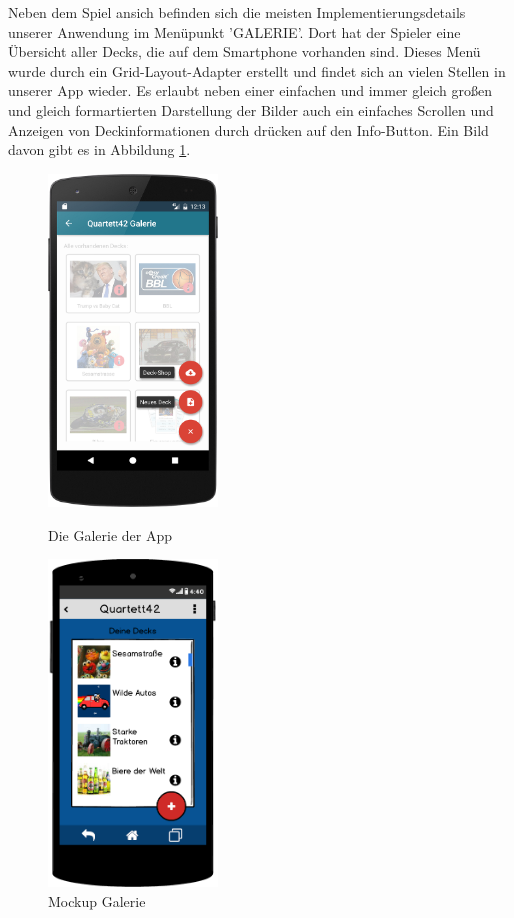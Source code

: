 Neben dem Spiel ansich befinden sich die meisten Implementierungsdetails unserer Anwendung im Menüpunkt 'GALERIE'. Dort hat der Spieler eine Übersicht aller Decks, die auf dem Smartphone vorhanden sind. Dieses Menü wurde durch ein Grid-Layout-Adapter erstellt und findet sich an vielen Stellen in unserer App wieder. Es erlaubt neben einer einfachen und immer gleich großen und gleich formartierten Darstellung der Bilder auch ein einfaches Scrollen und Anzeigen von Deckinformationen durch drücken auf den Info-Button. Ein Bild davon gibt es in Abbildung \ref{figure:implementierunggalerie}. 

\begin{figure}[h]
    \centering
    \begin{minipage}{0.49\textwidth}
        \centering
        \includegraphics[width=0.4\textwidth]{img/screenshots/device_gallery.png}
		\caption{Die Galerie der App}
		\label{figure:implementierunggalerie} 
	\end{minipage}
    \begin{minipage}{0.49\textwidth}
        \centering
        \includegraphics[width=0.4\textwidth]{img/mockups/galerie_uebersicht.png}
        \caption{Mockup Galerie}
    \end{minipage}
\end{figure}

